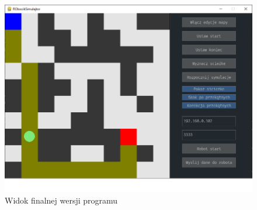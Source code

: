 \begin{figure}[H]
	\centering
	\includegraphics[width=16cm]{pages/implementacja/zdjecia/calyProgram.png}
	\caption{Widok finalnej wersji programu}
	\label{fig:finalnaWersjaProgramu}
\end{figure}